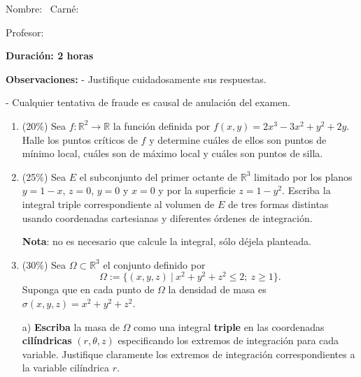 \documentclass[11pt]{article}
\begin{document}
\examheader

\vspace{4pt}
\noindent Nombre: \dotfill\ Carné: \dotfill

\vspace{4pt}
\noindent Profesor: \dotfill

\begin{center}\textbf{Duración: 2 horas}\end{center}

\noindent\textbf{Observaciones:} - Justifique cuidadosamente sus respuestas.

\hspace{2.3cm} - Cualquier tentativa de fraude es causal de anulación del examen.

\vspace{8pt}
\begin{enumerate}
\item{} (20\%) Sea $f:\mathbb{R}^2\longrightarrow\mathbb{R}$ la función definida por $f(x,y)=2x^3-3x^2+y^2+2y$. Halle los puntos críticos de $f$ y determine cuáles de ellos son puntos de mínimo local, cuáles son de máximo local y cuáles son puntos de silla.

\vspace{4cm}

\item{} (25\%) Sea $E$ el subconjunto del primer octante de $\mathbb{R}^3$ limitado por los planos $y=1-x$, $z=0$, $y=0$ y $x=0$ y por la superficie $z=1-y^2$. Escriba la integral triple correspondiente al volumen de $E$ de tres formas distintas usando coordenadas cartesianas y diferentes órdenes de integración.

\noindent \textbf{Nota}: no es necesario que calcule la integral, sólo déjela planteada.

\vspace{5cm}

\item{} (30\%) Sea $\Omega\subset\mathbb{R}^3$ el conjunto definido por
\[
\Omega := \{(x,y,z)\ |\ x^2+y^2+z^2\leq 2;\ z\geq 1\}.
\]
\noindent Suponga que en cada punto de $\Omega$ la densidad de masa es $\sigma(x,y,z)=x^2+y^2+z^2$.

\vspace{4pt}
\noindent a) \textbf{Escriba} la masa de $\Omega$ como una integral \textbf{triple} en las coordenadas \textbf{cilíndricas} $(r,\theta,z)$ especificando los extremos de integración para cada variable. Justifique claramente los extremos de integración correspondientes a la variable cilíndrica $r$.


\end{enumerate}
\end{document}
